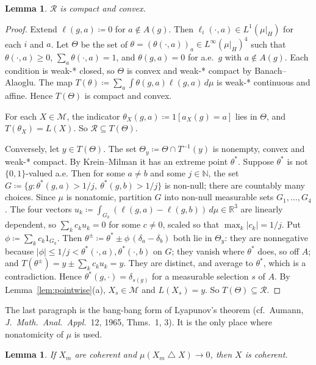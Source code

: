 \documentclass[11pt]{article}
\newtheorem{lemma}[theorem]{Lemma}
\theoremstyle{remark}
\newcommand{\R}{\mathbb R}
\newcommand{\M}{\mathcal M}
\newcommand{\Rr}{\mathcal R}
\newcommand{\sd}{\mathbin{\triangle}}
\begin{document}
\begin{lemma}\label{lem:R}
$\Rr$ is compact and convex.
\end{lemma}

\begin{proof}
Extend $\ell(g,a)\coloneqq0$ for $a\notin A(g)$. Then $\ell_i(\cdot,a)\in L^1(\mu|_H)$ for each $i$ and $a$. Let $\Theta$ be the set of $\theta=(\theta(\cdot,a))_a\in L^\infty(\mu|_H)^4$ such that $\theta(\cdot,a)\ge0$, $\sum_a\theta(\cdot,a)=1$, and $\theta(g,a)=0$ for a.e.\ $g$ with $a\notin A(g)$. Each condition is weak-* closed, so $\Theta$ is convex and weak-* compact by Banach--Alaoglu. The map $T(\theta)\coloneqq\sum_a\int\theta(g,a)\ell(g,a)\,d\mu$ is weak-* continuous and affine. Hence $T(\Theta)$ is compact and convex.

For each $X\in\M$, the indicator $\theta_X(g,a)\coloneqq 1[a_X(g)=a]$ lies in $\Theta$, and $T(\theta_X)=L(X)$. So $\Rr\subseteq T(\Theta)$.

Conversely, let $y\in T(\Theta)$. The set $\Theta_y\coloneqq\Theta\cap T^{-1}(y)$ is nonempty, convex and weak-* compact. By Krein--Milman it has an extreme point $\theta^*$. Suppose $\theta^*$ is not $\{0,1\}$-valued a.e. Then for some $a\ne b$ and some $j\in\mathbb N$, the set $G\coloneqq\{g:\theta^*(g,a)>1/j,\ \theta^*(g,b)>1/j\}$ is non-null; there are countably many choices. Since $\mu$ is nonatomic, partition $G$ into non-null measurable sets $G_1,\dots,G_4$. The four vectors $u_k\coloneqq\int_{G_k}(\ell(g,a)-\ell(g,b))\,d\mu\in\R^3$ are linearly dependent, so $\sum_kc_ku_k=0$ for some $c\ne0$, scaled so that $\max_k|c_k|=1/j$. Put $\phi\coloneqq\sum_kc_k1_{G_k}$. Then $\theta^\pm\coloneqq\theta^*\pm\phi\,(\delta_a-\delta_b)$ both lie in $\Theta_y$: they are nonnegative because $|\phi|\le1/j<\theta^*(\cdot,a),\theta^*(\cdot,b)$ on $G$; they vanish where $\theta^*$ does, so off $A$; and $T(\theta^\pm)=y\pm\sum_kc_ku_k=y$. They are distinct, and average to $\theta^*$, which is a contradiction. Hence $\theta^*(g,\cdot)=\delta_{s(g)}$ for a measurable selection $s$ of $A$. By Lemma~\ref{lem:pointwise}(a), $X_s\in\M$ and $L(X_s)=y$. So $T(\Theta)\subseteq\Rr$.
\end{proof}

\noindent The last paragraph is the bang-bang form of Lyapunov's theorem (cf.\ Aumann, \emph{J.\ Math.\ Anal.\ Appl.}\ 12, 1965, Thms.~1, 3). It is the only place where nonatomicity of $\mu$ is used.

\begin{lemma}\label{lem:cohclosed}
If $X_m$ are coherent and $\mu(X_m\sd X)\to0$, then $X$ is coherent.
\end{lemma}
\end{document}
